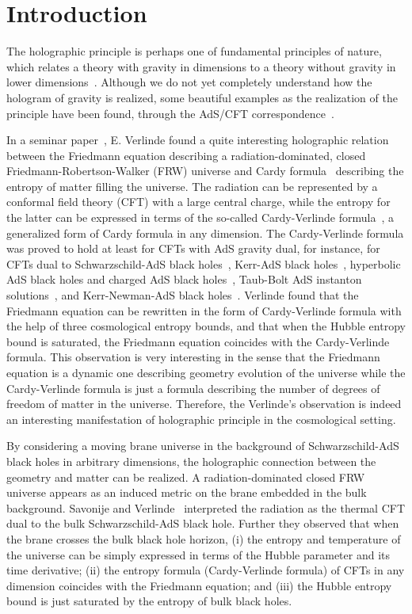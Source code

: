 \documentclass[a4paper,12pt]{article}
\providecommand{\sect}[1]{\setcounter{equation}{0}\section{#1}}
\begin{document}
\sect{Introduction}

The holographic principle is perhaps one of fundamental principles
of nature, which relates a theory with gravity in \coordHE{} dimensions
to a theory without gravity in lower dimensions~\cite{Hooft}.
Although we do not yet completely understand how the hologram of
gravity is realized, some beautiful examples as the realization of
the principle have been found, through the AdS/CFT
correspondence~\cite{AdS}.


In a seminar paper~\cite{Verl},  E. Verlinde found a quite
interesting holographic relation between the Friedmann equation
describing  a radiation-dominated, closed
Friedmann-Robertson-Walker (FRW) universe and Cardy
formula~\cite{Cardy} describing the entropy of matter filling the
universe. The radiation can be represented by a conformal field
theory (CFT) with a large central charge, while the entropy for the
latter can be expressed in terms of the so-called Cardy-Verlinde
formula~\cite{Verl}, a generalized form of Cardy formula in any
dimension. The Cardy-Verlinde formula was proved to hold at least
for CFTs with AdS gravity dual, for instance, for CFTs dual to
Schwarzschild-AdS black holes~\cite{Verl}, Kerr-AdS black
holes~\cite{Klemm}, hyperbolic AdS black holes and charged AdS
black holes~\cite{Cai1}, Taub-Bolt AdS instanton
solutions~\cite{Birm}, and Kerr-Newman-AdS black
holes~\cite{Jing}. Verlinde found that the Friedmann equation can
be rewritten in the form of Cardy-Verlinde formula with the help
of three cosmological entropy bounds, and that when the Hubble entropy
bound is saturated, the Friedmann equation coincides with the
Cardy-Verlinde formula.  This observation is very interesting in the 
sense that the Friedmann equation is a dynamic one describing geometry
evolution of the universe while the Cardy-Verlinde formula is just a formula
describing the number of degrees of freedom of matter in the universe.
Therefore, the Verlinde's observation is indeed an interesting 
manifestation of holographic principle in the cosmological setting.

By considering a moving brane universe in the background of
Schwarzschild-AdS black holes in arbitrary dimensions, the
holographic connection between the geometry and matter can be
realized. A radiation-dominated closed FRW universe appears as an induced
metric on the brane embedded in the bulk background. Savonije and 
Verlinde~\cite{SV} interpreted the radiation
as the thermal CFT dual to the bulk Schwarzschild-AdS black hole. 
Further they observed that when the
brane crosses the bulk black hole horizon, (i) the entropy and
temperature of the universe can be simply expressed in terms of
the Hubble parameter and its time derivative; (ii) the entropy
formula (Cardy-Verlinde formula) of CFTs in any dimension
coincides with the Friedmann equation; and (iii) the Hubble entropy
bound is just saturated by the entropy of bulk black holes.
\end{document}
